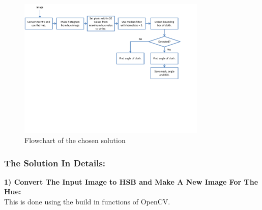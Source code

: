 

\begin{figure}[H]
\begin{center}
\leavevmode
\includegraphics[width=0.8\textwidth]{images/tabledetect_flowchart}
\end{center}
\caption{Flowchart of the chosen solution}
\label{fig:tabledetect_flowchart}
\end{figure}

\subsubsection{The Solution In Details:}
\textbf{1) Convert The Input Image to HSB and Make A New Image For The Hue:}\\
This is done using the build in functions of OpenCV.\\

